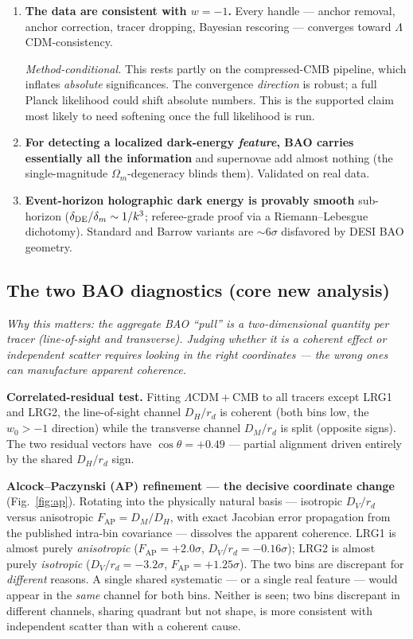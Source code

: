\documentclass[11pt]{article}
\newcommand{\LCDM}{$\Lambda$CDM}
\newcommand{\Om}{\ensuremath{\Omega_m}}
\newcommand{\wo}{\ensuremath{w_0}}
\newcommand{\Dmrd}{\ensuremath{D_M/r_d}}
\newcommand{\Dhrd}{\ensuremath{D_H/r_d}}
\newcommand{\Dvrd}{\ensuremath{D_V/r_d}}
\newcommand{\FAP}{\ensuremath{F_{\mathrm{AP}}}}
\begin{document}
\begin{enumerate}[leftmargin=1.3em,itemsep=0.5em]
\item \textbf{The data are consistent with $w=-1$.} Every handle --- anchor removal, anchor correction, tracer dropping, Bayesian rescoring --- converges toward \LCDM-consistency.
\begin{caveatbox}
\textit{Method-conditional.} This rests partly on the compressed-CMB pipeline, which inflates \emph{absolute} significances. The convergence \emph{direction} is robust; a full Planck likelihood could shift absolute numbers. This is the supported claim most likely to need softening once the full likelihood is run.
\end{caveatbox}

\item \textbf{For detecting a localized dark-energy \emph{feature}, BAO carries essentially all the information} and supernovae add almost nothing (the single-magnitude \Om-degeneracy blinds them). Validated on real data.

\item \textbf{Event-horizon holographic dark energy is provably smooth} sub-horizon ($\delta_{\rm DE}/\delta_m\sim 1/k^3$; referee-grade proof via a Riemann--Lebesgue dichotomy). Standard and Barrow variants are $\sim\!6\sigma$ disfavored by DESI BAO geometry.
\end{enumerate}

\subsection{The two BAO diagnostics (core new analysis)}

\emph{Why this matters: the aggregate BAO ``pull'' is a two-dimensional quantity per tracer (line-of-sight and transverse). Judging whether it is a coherent effect or independent scatter requires looking in the right coordinates --- the wrong ones can manufacture apparent coherence.}

\textbf{Correlated-residual test.} Fitting \LCDM${}+{}$CMB to all tracers except LRG1 and LRG2, the line-of-sight channel \Dhrd{} is coherent (both bins low, the $\wo>-1$ direction) while the transverse channel \Dmrd{} is split (opposite signs). The two residual vectors have $\cos\theta = +0.49$ --- partial alignment driven entirely by the shared \Dhrd{} sign.

\textbf{Alcock--Paczynski (AP) refinement --- the decisive coordinate change} (Fig.~\ref{fig:ap}). Rotating into the physically natural basis --- isotropic \Dvrd{} versus anisotropic $\FAP=D_M/D_H$, with exact Jacobian error propagation from the published intra-bin covariance --- dissolves the apparent coherence. LRG1 is almost purely \emph{anisotropic} ($\FAP=+2.0\sigma$, $\Dvrd=-0.16\sigma$); LRG2 is almost purely \emph{isotropic} ($\Dvrd=-3.2\sigma$, $\FAP=+1.25\sigma$). The two bins are discrepant for \emph{different} reasons. A single shared systematic --- or a single real feature --- would appear in the \emph{same} channel for both bins. Neither is seen; two bins discrepant in different channels, sharing quadrant but not shape, is more consistent with independent scatter than with a coherent cause.
\end{document}

